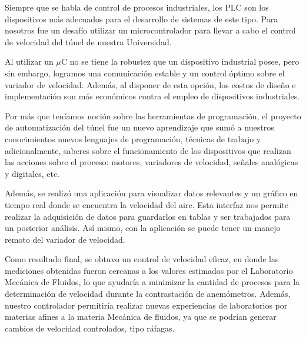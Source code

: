 Siempre que se habla de control de procesos industriales, los PLC son los dispositivos más adecuados para el desarrollo de sistemas de este tipo. Para nosotros fue un desafío utilizar un microcontrolador para llevar a cabo el control de velocidad del túnel de nuestra Universidad.

Al utilizar un $\mu$C no se tiene la robustez que un dispositivo industrial posee, pero sin embargo, logramos una comunicación estable y un control óptimo sobre el variador de velocidad. Además, al disponer de esta opción, los costos de diseño e implementación son más económicos contra el empleo de dispositivos industriales.

Por más que teníamos noción sobre las herramientas de programación, el proyecto de automatización del túnel fue un nuevo aprendizaje que sumó a nuestros conocimientos nuevos lenguajes de programación, técnicas de trabajo y adicionalmente, saberes sobre el funcionamiento de los dispositivos que realizan las acciones sobre el proceso: motores, variadores de velocidad, señales analógicas y digitales, etc. 

Además, se realizó una aplicación para visualizar datos relevantes y un gráfico en tiempo real donde se encuentra la velocidad del aire. Esta interfaz nos permite realizar la adquisición de datos para guardarlos en tablas y ser trabajados para un posterior análisis. Así mismo, con la aplicación se puede tener un manejo remoto del variador de velocidad.

Como resultado final, se obtuvo un control de velocidad eficaz, en donde las mediciones obtenidas fueron cercanas a los valores estimados por el Laboratorio Mecánica de Fluidos, lo que ayudaría a minimizar la cantidad de procesos para la determinación de velocidad durante la contrastación de anemómetros. Además, nuestro controlador permitiría realizar nuevas experiencias de laboratorios por materias afines a la materia Mecánica de fluidos, ya que se podrían generar cambios de velocidad controlados, tipo ráfagas.

